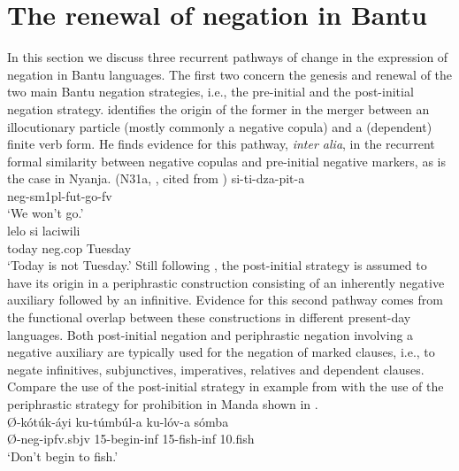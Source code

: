 \documentclass[output=paper]{langsci/langscibook}
\begin{document}
\section{The renewal of negation in Bantu}\label{sec:1:2} In this section
we discuss three recurrent pathways of change in the expression of negation
in Bantu languages. The first two concern the genesis and renewal of the
two main Bantu negation strategies, i.e., the pre-initial and the
post-initial negation strategy. \citet{Guldemann1996,Guldemann1999}
identifies the origin of the former in the merger between an illocutionary
particle (mostly commonly a negative copula) and a (dependent) finite verb
form. He finds evidence for this pathway, {\it inter alia}, in the
recurrent formal similarity between negative copulas and pre-initial
negative markers, as is the case in Nyanja.
\ea\label{ex:nyanja-go-tuesday} 
 (N31a, \citealt[174]{StevickHollander1965}, cited from \citealt[568]{Guldemann1999})
\ea\label{ex:nyanja-go} \gll
si-ti-dza-pit-a\\ {\sc neg-sm}1pl-{\sc fut}-go-{\sc fv}\\ \glt `We won't
go.'\\ \ex\label{ex:nyanja-tuesday} \gll lelo si laciwili\\ today {\sc
neg.cop} Tuesday\\ \glt `Today is not Tuesday.’ \z\z Still following
\citet{Guldemann1996,Guldemann1999}, the post-initial strategy is assumed
to have its origin in a periphrastic construction consisting of an
inherently negative auxiliary followed by an infinitive. Evidence for this
second pathway comes from the functional overlap between these
constructions in different present-day languages. Both post-initial
negation and periphrastic negation involving a negative auxiliary are
typically used for the negation of marked clauses, i.e., to negate
infinitives, subjunctives, imperatives, relatives and dependent clauses.
Compare the use of the post-initial strategy in example 
from  with the use of the periphrastic strategy for prohibition in
Manda shown in .  \ea\label{ex:manda-fish}
\\ \gll Ø-kótúk-áyi
ku-túmbúl-a ku-lóv-a sómba\\ Ø-{\sc neg-ipfv.sbjv} 15-begin-{\sc inf}
15-fish-{\sc inf} 10.fish\\ \glt `Don't begin to fish.' \z
\end{document}
